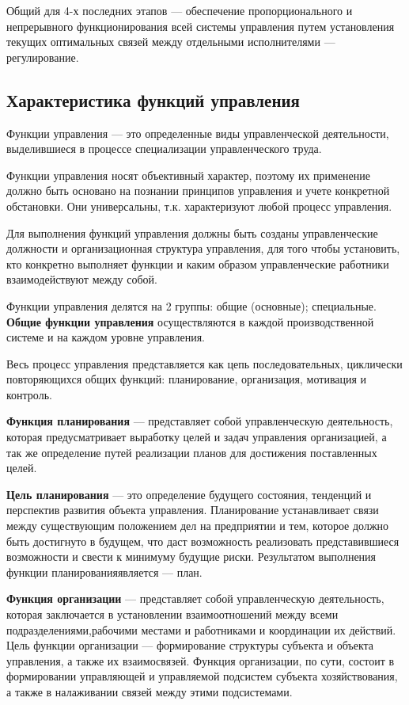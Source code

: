 \documentclass[a4paper,12pt,oneside,final]{extarticle}
\numberwithin{equation}{section}
\begin{document}
Общий для 4-х последних этапов — обеспечение пропорционального и непрерывного функционирования всей системы управления путем установления текущих оптимальных связей между отдельными исполнителями — регулирование.

\subsection{Характеристика функций управления}
Функции управления --- это определенные виды управленческой деятельности, выделившиеся в процессе специализации управленческого труда.

Функции управления носят объективный характер, поэтому их применение должно быть основано на познании принципов управления и учете конкретной обстановки. 
Они универсальны, т.к. характеризуют любой процесс управления.

Для выполнения функций управления должны быть созданы управленческие должности и организационная структура управления, для того чтобы установить, кто конкретно выполняет функции и каким образом управленческие работники взаимодействуют между собой.

Функции управления делятся на 2 группы: общие (основные); специальные.
\textbf{Общие функции управления} осуществляются в каждой производственной системе и на каждом уровне управления. 

Весь процесс управления представляется как цепь последовательных, циклически повторяющихся общих функций: планирование, организация, мотивация и контроль.

\textbf{Функция планирования} --- представляет собой управленческую деятельность, которая предусматривает выработку целей и задач управления организацией, а так же определение путей реализации планов для достижения поставленных целей.

\textbf{Цель планирования} --- это определение будущего состояния, тенденций и перспектив развития объекта управления.
Планирование устанавливает связи между существующим положением дел на предприятии и тем, которое должно быть достигнуто в будущем, что даст возможность реализовать представившиеся возможности и свести к минимуму будущие риски. Результатом выполнения функции планированияявляется --- план.

\textbf{Функция организации} --- представляет собой управленческую деятельность, которая заключается в установлении взаимоотношений между всеми подразделениями,рабочими местами и работниками и координации их действий. 
Цель функции организации --- формирование структуры субъекта и объекта управления, а также их взаимосвязей. 
Функция организации, по сути, состоит в формировании управляющей и управляемой подсистем субъекта хозяйствования, а также в налаживании связей между этими подсистемами. 
\end{document}
